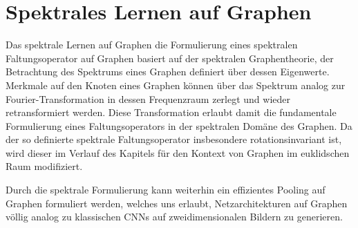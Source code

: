 \chapter{Spektrales Lernen auf Graphen}
\label{spektrales_lernen}

Das spektrale Lernen auf Graphen \bzw{} die Formulierung eines spektralen Faltungsoperator auf Graphen basiert auf der spektralen Graphentheorie, \dhe{} der Betrachtung des Spektrums eines Graphen definiert über dessen Eigenwerte.
Merkmale auf den Knoten eines Graphen können über das Spektrum analog zur Fourier-Transformation in dessen Frequenzraum zerlegt und wieder retransformiert werden.
Diese Transformation erlaubt damit die fundamentale Formulierung eines Faltungsoperators in der spektralen Domäne des Graphen.
Da der so definierte spektrale Faltungsoperator insbesondere rotationsinvariant ist, wird dieser im Verlauf des Kapitels für den Kontext von Graphen im euklidschen Raum modifiziert.

Durch die spektrale Formulierung kann weiterhin ein effizientes Pooling auf Graphen formuliert werden, welches uns erlaubt, Netzarchitekturen auf Graphen völlig analog zu klassischen \glspl{CNN} auf zweidimensionalen Bildern zu generieren.







